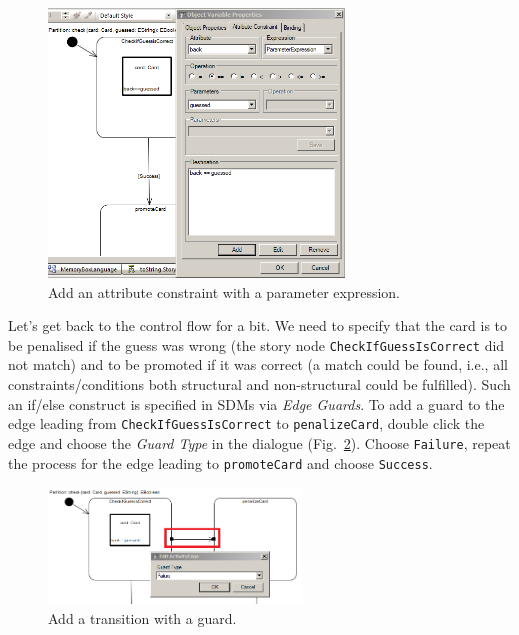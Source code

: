 \begin{figure}[htbp] 
\begin{center}
  \includegraphics[width=0.7\textwidth]{pics/sdmBilder/check/sdm18RAW}
  \caption{Add an attribute constraint with a parameter expression.}  
  \label{fig:sdm_check_att_constraint}
\end{center}
\end{figure} 

Let's get back to the control flow for a bit.  We need to specify that the card
is to be penalised if the guess was wrong (the story node
\texttt{Check\-If\-Guess\-Is\-Correct} did not match) and to be promoted if it
was correct (a match could be found, i.e., all constraints/conditions both
structural and non-structural could be fulfilled).  Such an if/else construct is
specified in SDMs via \emph{Edge Guards}.  To add a guard to the edge leading
from \texttt{Check\-If\-Guess\-Is\-Correct} to \texttt{penalize\-Card}, double
click the edge and choose the \emph{Guard Type} in the dialogue
(Fig.~\ref{fig:sdm_check_guard}).  Choose \texttt{Failure}, repeat the process
for the edge leading to \texttt{promoteCard} and choose \texttt{Success}.

\begin{figure}[!htbp]
\begin{center}
  \includegraphics[width=0.6\textwidth]{pics/sdmBilder/check/sdm19}
  \caption{Add a transition with a guard.}  
  \label{fig:sdm_check_guard}
\end{center}
\end{figure}


